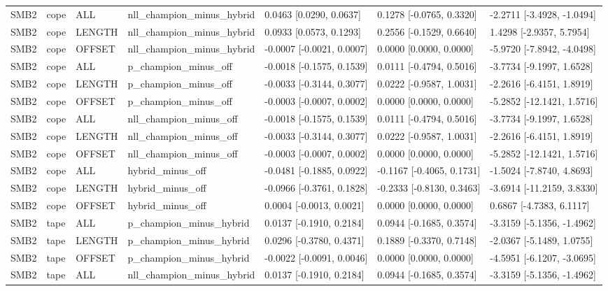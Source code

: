 \begin{tabular}{lllllll}
SMB2 & cope & ALL & nll\_champion\_minus\_hybrid & 0.0463 [0.0290, 0.0637] & 0.1278 [-0.0765, 0.3320] & -2.2711 [-3.4928, -1.0494] \\
SMB2 & cope & LENGTH & nll\_champion\_minus\_hybrid & 0.0933 [0.0573, 0.1293] & 0.2556 [-0.1529, 0.6640] & 1.4298 [-2.9357, 5.7954] \\
SMB2 & cope & OFFSET & nll\_champion\_minus\_hybrid & -0.0007 [-0.0021, 0.0007] & 0.0000 [0.0000, 0.0000] & -5.9720 [-7.8942, -4.0498] \\
SMB2 & cope & ALL & p\_champion\_minus\_off & -0.0018 [-0.1575, 0.1539] & 0.0111 [-0.4794, 0.5016] & -3.7734 [-9.1997, 1.6528] \\
SMB2 & cope & LENGTH & p\_champion\_minus\_off & -0.0033 [-0.3144, 0.3077] & 0.0222 [-0.9587, 1.0031] & -2.2616 [-6.4151, 1.8919] \\
SMB2 & cope & OFFSET & p\_champion\_minus\_off & -0.0003 [-0.0007, 0.0002] & 0.0000 [0.0000, 0.0000] & -5.2852 [-12.1421, 1.5716] \\
SMB2 & cope & ALL & nll\_champion\_minus\_off & -0.0018 [-0.1575, 0.1539] & 0.0111 [-0.4794, 0.5016] & -3.7734 [-9.1997, 1.6528] \\
SMB2 & cope & LENGTH & nll\_champion\_minus\_off & -0.0033 [-0.3144, 0.3077] & 0.0222 [-0.9587, 1.0031] & -2.2616 [-6.4151, 1.8919] \\
SMB2 & cope & OFFSET & nll\_champion\_minus\_off & -0.0003 [-0.0007, 0.0002] & 0.0000 [0.0000, 0.0000] & -5.2852 [-12.1421, 1.5716] \\
SMB2 & cope & ALL & hybrid\_minus\_off & -0.0481 [-0.1885, 0.0922] & -0.1167 [-0.4065, 0.1731] & -1.5024 [-7.8740, 4.8693] \\
SMB2 & cope & LENGTH & hybrid\_minus\_off & -0.0966 [-0.3761, 0.1828] & -0.2333 [-0.8130, 0.3463] & -3.6914 [-11.2159, 3.8330] \\
SMB2 & cope & OFFSET & hybrid\_minus\_off & 0.0004 [-0.0013, 0.0021] & 0.0000 [0.0000, 0.0000] & 0.6867 [-4.7383, 6.1117] \\
SMB2 & tape & ALL & p\_champion\_minus\_hybrid & 0.0137 [-0.1910, 0.2184] & 0.0944 [-0.1685, 0.3574] & -3.3159 [-5.1356, -1.4962] \\
SMB2 & tape & LENGTH & p\_champion\_minus\_hybrid & 0.0296 [-0.3780, 0.4371] & 0.1889 [-0.3370, 0.7148] & -2.0367 [-5.1489, 1.0755] \\
SMB2 & tape & OFFSET & p\_champion\_minus\_hybrid & -0.0022 [-0.0091, 0.0046] & 0.0000 [0.0000, 0.0000] & -4.5951 [-6.1207, -3.0695] \\
SMB2 & tape & ALL & nll\_champion\_minus\_hybrid & 0.0137 [-0.1910, 0.2184] & 0.0944 [-0.1685, 0.3574] & -3.3159 [-5.1356, -1.4962] \\

\end{tabular}
